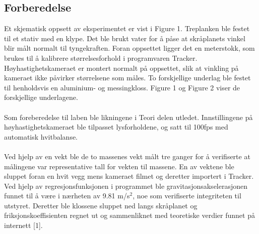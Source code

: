 \documentclass[10pt,a4paper]{report}
\begin{document}
\subsection*{Forberedelse}
Et skjematisk oppsett av eksperimentet er vist i Figure 1. Treplanken ble festet til et stativ med en klype. Det ble brukt vater for å påse at skråplanets vinkel blir målt normalt til tyngekraften. Foran oppsettet ligger det en meterstokk, som brukes til å kalibrere størrelsesforhold i programvaren Tracker. Høyhastighetskameraet er montert normalt på oppsettet, slik at vinkling på kameraet ikke påvirker størrelsene som måles. To forskjellige underlag ble festet til henholdsvis en aluminium- og messingkloss. Figure 1 og Figure 2 viser de forskjellige underlagene.\\
\\Som foreberedelse til laben ble likningene i Teori delen utledet. Innstillingene på høyhastighetskameraet ble tilpasset lysforholdene, og satt til 100fps med automatisk hvitbalanse.\\
\\Ved hjelp av en vekt ble de to massenes vekt målt tre ganger for å verifiserte at målingene var representative tall for vekten til massene. En av vektene ble sluppet foran en hvit vegg mens kameraet filmet og deretter importert i Tracker. Ved hjelp av regresjonsfunksjonen i programmet ble gravitasjonsakselerasjonen funnet til å være i nærheten av 9.81 m/s$^2$, noe som verifiserte integriteten til utstyret. Deretter ble klossene sluppet ned langs skråplanet og friksjonskoeffisienten regnet ut og sammenliknet med teoretiske verdier funnet på internett [1].
\end{document}

